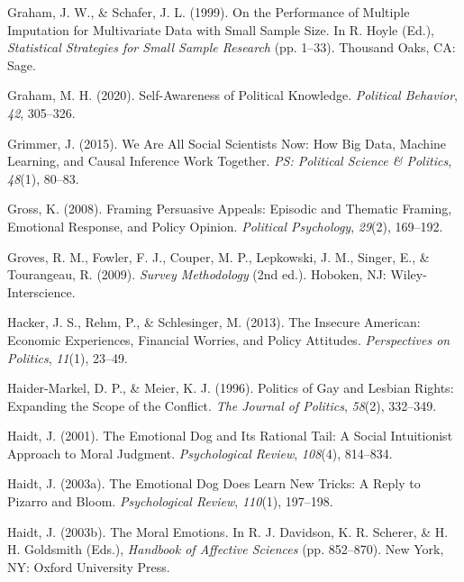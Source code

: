 \documentclass[12pt,econ]{sources/authesis}
\begin{document}
\leavevmode\hypertarget{ref-graham_1999_performance}{}%
Graham, J. W., \& Schafer, J. L. (1999). On the Performance of Multiple Imputation for Multivariate Data with Small Sample Size. In R. Hoyle (Ed.), \emph{Statistical Strategies for Small Sample Research} (pp. 1--33). Thousand Oaks, CA: Sage.

\leavevmode\hypertarget{ref-graham_2020_self-awareness}{}%
Graham, M. H. (2020). Self-Awareness of Political Knowledge. \emph{Political Behavior}, \emph{42}, 305--326.

\leavevmode\hypertarget{ref-grimmer_2015_social}{}%
Grimmer, J. (2015). We Are All Social Scientists Now: How Big Data, Machine Learning, and Causal Inference Work Together. \emph{PS: Political Science \& Politics}, \emph{48}(1), 80--83.

\leavevmode\hypertarget{ref-gross_framing_2008}{}%
Gross, K. (2008). Framing Persuasive Appeals: Episodic and Thematic Framing, Emotional Response, and Policy Opinion. \emph{Political Psychology}, \emph{29}(2), 169--192.

\leavevmode\hypertarget{ref-groves_survey_2009}{}%
Groves, R. M., Fowler, F. J., Couper, M. P., Lepkowski, J. M., Singer, E., \& Tourangeau, R. (2009). \emph{Survey Methodology} (2nd ed.). Hoboken, NJ: Wiley-Interscience.

\leavevmode\hypertarget{ref-hacker_insecure_2013}{}%
Hacker, J. S., Rehm, P., \& Schlesinger, M. (2013). The Insecure American: Economic Experiences, Financial Worries, and Policy Attitudes. \emph{Perspectives on Politics}, \emph{11}(1), 23--49.

\leavevmode\hypertarget{ref-haider-markel_1996_politics}{}%
Haider-Markel, D. P., \& Meier, K. J. (1996). Politics of Gay and Lesbian Rights: Expanding the Scope of the Conflict. \emph{The Journal of Politics}, \emph{58}(2), 332--349.

\leavevmode\hypertarget{ref-haidt_2001_emotional}{}%
Haidt, J. (2001). The Emotional Dog and Its Rational Tail: A Social Intuitionist Approach to Moral Judgment. \emph{Psychological Review}, \emph{108}(4), 814--834.

\leavevmode\hypertarget{ref-haidt_2003_emotional}{}%
Haidt, J. (2003a). The Emotional Dog Does Learn New Tricks: A Reply to Pizarro and Bloom. \emph{Psychological Review}, \emph{110}(1), 197--198.

\leavevmode\hypertarget{ref-haidt_moral_2003}{}%
Haidt, J. (2003b). The Moral Emotions. In R. J. Davidson, K. R. Scherer, \& H. H. Goldsmith (Eds.), \emph{Handbook of Affective Sciences} (pp. 852--870). New York, NY: Oxford University Press.
\end{document}
